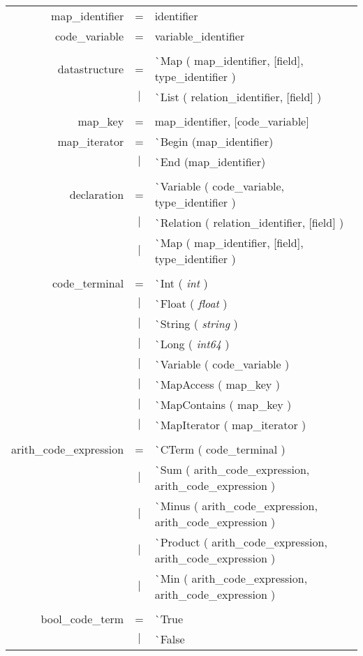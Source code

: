 \documentclass{article}
\begin{document}
\begin{tabular}[ht] {rcl}
map\_identifier &=& identifier\\
code\_variable &=& variable\_identifier\\
\\
datastructure &=& \`{}Map ( map\_identifier, [field], type\_identifier )\\
&$\lvert$ & \`{}List ( relation\_identifier, [field] )\\
\\
map\_key &=& map\_identifier, [code\_variable] \\
map\_iterator &=& \`{}Begin (map\_identifier)\\
&$\lvert$ & \`{}End (map\_identifier)\\
\\
declaration &=& \`{}Variable ( code\_variable, type\_identifier )\\
&$\lvert$ & \`{}Relation ( relation\_identifier, [field] )\\ 
&$\lvert$ & \`{}Map ( map\_identifier, [field], type\_identifier )\\
\\
code\_terminal &=& \`{}Int ( \emph{int} )\\
&$\lvert$ & \`{}Float ( \emph{float} )\\
&$\lvert$ & \`{}String ( \emph{string} )\\
&$\lvert$ & \`{}Long ( \emph{int64} )\\
&$\lvert$ & \`{}Variable ( code\_variable )\\
&$\lvert$ & \`{}MapAccess ( map\_key )\\
&$\lvert$ & \`{}MapContains ( map\_key )\\
&$\lvert$ & \`{}MapIterator ( map\_iterator )\\
\\
arith\_code\_expression &=& \`{}CTerm ( code\_terminal )\\
&$\lvert$ & \`{}Sum ( arith\_code\_expression, arith\_code\_expression )\\
&$\lvert$ & \`{}Minus ( arith\_code\_expression, arith\_code\_expression )\\
&$\lvert$ & \`{}Product ( arith\_code\_expression, arith\_code\_expression )\\
&$\lvert$ & \`{}Min ( arith\_code\_expression, arith\_code\_expression ) \\
\\
bool\_code\_term &=& \`{}True \\
&$\lvert$ & \`{}False \\

\end{tabular}
\end{document}
